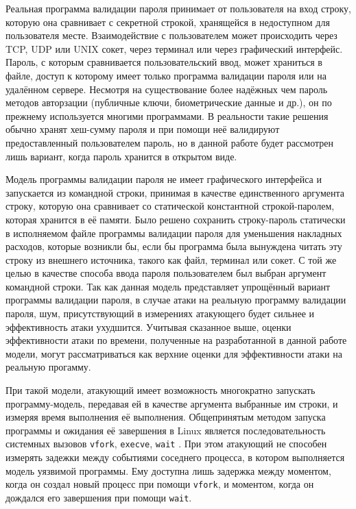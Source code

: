 Реальная программа валидации пароля принимает от пользователя на вход строку,
которую она сравнивает с секретной строкой, хранящейся в недоступном для
пользователя месте. Взаимодействие с пользователем может происходить через
TCP, UDP или UNIX сокет, через терминал или через графический интерфейс.
Пароль, с которым сравнивается пользовательский ввод, может храниться в файле,
доступ к которому имеет только программа валидации пароля или на удалённом
сервере. Несмотря на существование более надёжных чем пароль методов авторзации
(публичные ключи, биометрические данные и др.), он по прежнему используется
многими программами. В реальности такие решения обычно хранят хеш-сумму пароля и
при помощи неё валидируют предоставленный пользователем пароль, но в данной работе
будет рассмотрен лишь вариант, когда пароль хранится в открытом виде.

Модель программы валидации пароля не имеет графического интерфейса и запускается
из командной строки, принимая в качестве единственного аргумента строку, которую
она сравнивает со статической константной строкой-паролем, которая хранится в
её памяти. Было решено сохранить строку-пароль статически в исполняемом файле
программы валидации пароля для уменьшения накладных расходов, которые возникли
бы, если бы программа была вынуждена читать эту строку из внешнего источника,
такого как файл, терминал или сокет. С той же целью в качестве способа ввода
пароля пользователем был выбран аргумент командной строки. Так как данная модель
представляет упрощённый вариант программы валидации пароля, в случае атаки на
реальную программу валидации пароля, шум, присутствующий в измерениях атакующего
будет сильнее и эффективность атаки ухудшится. Учитывая сказанное выше,
оценки эффективности атаки по времени, полученные на разработанной в данной
работе модели, могут рассматриваться как верхние оценки для эффективности атаки
на реальную прогамму.

При такой модели, атакующий имеет возможность многократно запускать
программу-модель, передавая ей в качестве аргумента выбранные им строки, и
измеряя время выполнения её выполнения. Общепринятым методом запуска программы
и ожидания её завершения в Linux является последовательность системных вызовов
\texttt{vfork}, \texttt{execve}, \texttt{wait} \cite{kerrisk}. При этом
атакующий не способен измерять задежки между событиями соседнего процесса, в
котором выполняется модель уязвимой программы. Ему доступна лишь задержка между
моментом, когда он создал новый процесс при помощи \texttt{vfork}, и моментом,
когда он дождался его завершения при помощи \texttt{wait}.


\clearpage
